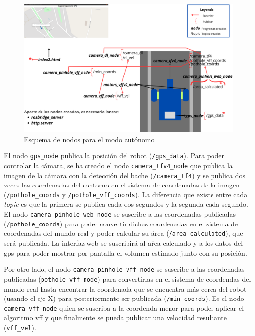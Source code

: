 \begin{figure} [h!]
	\begin{center}
			\includegraphics[width=15cm]{figs/cap7/esquema_nodos_vff_ampliado.png}
		\end{center}
	\caption{Esquema de nodos para el modo autónomo}
	\label{fig:nodosvff}
\end{figure}


El nodo \verb|gps_node| publica la posición del robot (\verb|/gps_data|). Para poder controlar la cámara, se ha creado el nodo \verb|camera_tfv4_node| que publica la imagen de la cámara con la detección del bache (\verb|/camera_tf4|) y se publica dos veces las coordenadas del contorno en el sistema de coordenadas de la imagen (\verb|/pothole_coords| y \verb|/pothole_vff_coords|). La diferencia que existe entre cada \textit{topic} es que la primera se publica cada dos segundos y la segunda cada segundo. El nodo \verb|camera_pinhole_web_node| se suscribe a las coordenadas publicadas (\verb|/pothole_coords|) para poder convertir dichas coordenadas en el sistema de coordenadas del mundo real y poder calcular su área (\verb|/area_calculated|), que será publicada. La interfaz web se suscribirá al aŕea calculado y a los datos del gps para poder mostrar por pantalla el volumen estimado junto con su posición. 

Por otro lado, el nodo \verb|camera_pinhole_vff_node| se suscribe a las coordenadas publicadas (\verb|pothole_vff_node|) para convertirlas en el sistema de coordendas del mundo real hasta encontrar la coordenada que se encuentra más cerca del robot (usando el eje X) para posteriormente ser publicada (\verb|/min_coords|). Es el nodo \verb|camera_vff_node| quien se suscriba a la coordenda menor para poder aplicar el algoritmo vff y que finalmente se pueda publicar una velocidad resultante (\verb|vff_vel|). 

